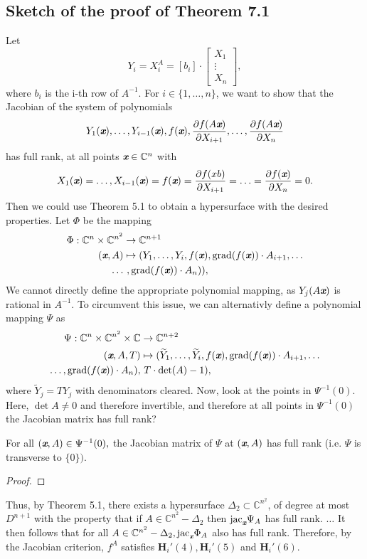 \documentclass[sigconf]{acmart}
\def\xb{\textit{\textbf{x}}}
\def\C{\mathbb{C}}
\def\jac{ \textrm{jac}}
\def\grad{\textrm{grad}}
\def\Yt{\widetilde{Y}}
\def\pa{\partial}
\def\bbm{\begin{bmatrix}}
\def\ebm{\end{bmatrix}}
\begin{document}
\subsection{Sketch of the proof of Theorem 7.1}
%
Let 
\[
Y_i = X_i^{A} = [b_i] \cdot \bbm X_1\\ \vdots \\ X_n \ebm, 
\]
where $b_i$ is the i-th row of $A^{-1}$. For $i \in \{1,\hdots,n\}$, we want to show that the Jacobian of the system of polynomials
\[
Y_1(\xb),\hdots,Y_{i-1}(\xb), f(\xb),  \frac{\pa f(A\xb)}{\pa X_{i+1}},\hdots,\frac{\pa f(A\xb)}{\pa X_n}
\]
has full rank, at all points $\xb \in \C^n$ with 
\[
X_1(\xb)=\hdots,X_{i-1}(\xb)=f(\xb)= \frac{\pa f(xb)}{\pa X_{i+1}}=\hdots = \frac{\pa f(\xb)}{\pa X_{n}}=0.
\]
Then we could use Theorem 5.1 to obtain a hypersurface with the desired properties. Let $\Phi$ be the mapping 
%
\begin{align*}
    \Phi: \C^n \times \C^{n^2} &\rightarrow \C^{n+1} \\
           (\xb,A) &\mapsto 
       (Y_1,\hdots,Y_i,f(\xb),\grad(f(\xb))\cdot A_{i+1},\hdots \\
       \hdots&~,\grad(f(\xb))\cdot A_{n})),
\end{align*}
%
We cannot directly define the appropriate polynomial mapping, as $Y_j(A\xb)$ is rational in $A^{-1}.$ To circumvent this issue, we can alternativly define a polynomial mapping $\Psi$ as  
%
\begin{align*}
    \Psi: \C^n \times \C^{n^2} \times \C &\rightarrow \C^{n+2} \\
           (\xb,A,T) &\mapsto 
       (\Yt_1,\hdots,\Yt_i,f(\xb),\grad(f(\xb))\cdot A_{i+1},\hdots \\
\hdots,\grad(f(\xb))\cdot A_{n}),&~T\cdot \det (A) - 1),
\end{align*}
%
where $\Yt_j=TY_j$ with denominators cleared. Now, look at the points in $\Psi^{-1}(0).$ Here, $\det A \not = 0$ and therefore invertible, and therefore at all points in $\Psi^{-1}(0)$ the Jacobian matrix has full rank? 
%
\begin{proposition}
For all $(\xb,A) \in \Psi^{-1}(0),$ the Jacobian matrix of $\Psi$ at $(\xb,A)$ has full rank (i.e. $\Psi$ is transverse to $\{0\}).$
\end{proposition}
%
\begin{proof}
\end{proof}
%
Thus, by Theorem 5.1, there exists a hypersurface $\Delta_2 \subset \C^{n^2}$, of degree at most $D^{n+1}$ with the property that if $A \in \C^{n^2}-\Delta_2$ then $\jac_{\xb}\Psi_A$ has full rank. $\hdots$ It then follows that for all $A \in \C^{n^2}-\Delta_2, \jac_{\xb}\Phi_A$ also has full rank. Therefore, by the Jacobian criterion, $f^A$ satisfies  $\textbf{H}_i'(4),\textbf{H}_i'(5)$ and $\textbf{H}_i'(6)$. 
%
%
%
%
\end{document}
